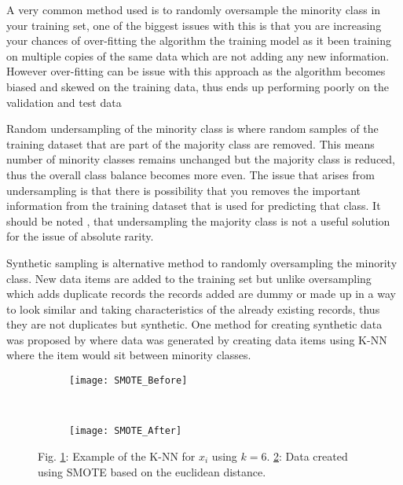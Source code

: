 A very common method used is to randomly oversample the minority class in your training set, one of the biggest issues with this is that you are increasing your chances of over-fitting the algorithm the training model as it been training on multiple copies of the same data which are not adding any new information. However over-fitting can be issue with this approach as the algorithm becomes biased and skewed on the training data, thus ends up performing poorly on the validation and test data \cite[see][]{hawkins_problem_2004}

Random undersampling of the minority class is where random samples of the training dataset that are part of the majority class are removed. This means number of minority classes remains unchanged but the majority class is reduced, thus the overall class balance becomes more even. The issue that arises from undersampling is that there is possibility that you removes the important information from the training dataset that is used for predicting that class. It should be noted \cite{kennedy_credit_2013}, that undersampling the majority class is not a useful solution for the issue of absolute rarity.

Synthetic sampling  is alternative method to randomly oversampling the minority class. New data items are added to the training set but unlike oversampling which adds duplicate records the records added are dummy or made up in a way to look similar and taking characteristics of the already existing records, thus they are not duplicates but synthetic. One method for creating synthetic data was proposed by \citep{chawla_smote:_2002} where data was generated by creating data items using K-NN where the item would sit between minority classes. 

\begin{figure}[H]
	\centering
	\begin{subfigure}[b]{0.32\textwidth}
		\captionsetup{font=scriptsize}
		\texttt{[image: SMOTE\_Before]}\caption{}
		\label{fig:SMOTE_Before}
	\end{subfigure}  ~\quad
	\begin{subfigure}[b]{0.32\textwidth}
		\captionsetup{font=scriptsize}
		\texttt{[image: SMOTE\_After]}
		\caption{}
		\label{fig:SMOTE_After}
	\end{subfigure}
	\caption{Fig. \ref{fig:SMOTE_Before}: Example of the K-NN for $x_i$ using $k = 6$. \ref{fig:SMOTE_After}: Data created using SMOTE based on the euclidean distance.\\
		\cite[Source:][]{he_learning_2009}}
	\label{fig:smoteExample}
\end{figure}

